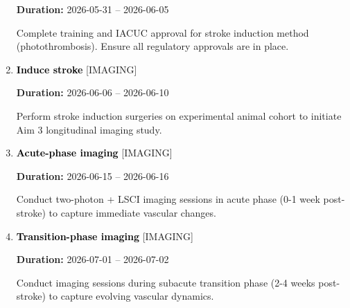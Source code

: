 \documentclass[landscape,a4paper]{article}
\begin{document}
\begin{enumerate}[leftmargin=1.5cm, itemsep=1em]
          \vspace{0.2em}
          \textcolor{black!70}{\textbf{Duration:} 2026-05-31 -- 2026-06-05}

          \vspace{0.4em}
          \begin{minipage}[t]{0.9\textwidth}
          \textcolor{black!85}{Complete training and IACUC approval for stroke induction method (photothrombosis). Ensure all regulatory approvals are in place.}
          \end{minipage}


    \item \textcolor{black}{\textbf{\large Induce stroke}}
          \hfill \textcolor{black!60}{\small [IMAGING]}
          
          \vspace{0.2em}
          \textcolor{black!70}{\textbf{Duration:} 2026-06-06 -- 2026-06-10}

          \vspace{0.4em}
          \begin{minipage}[t]{0.9\textwidth}
          \textcolor{black!85}{Perform stroke induction surgeries on experimental animal cohort to initiate Aim 3 longitudinal imaging study.}
          \end{minipage}


    \item \textcolor{black}{\textbf{\large Acute-phase imaging}}
          \hfill \textcolor{black!60}{\small [IMAGING]}
          
          \vspace{0.2em}
          \textcolor{black!70}{\textbf{Duration:} 2026-06-15 -- 2026-06-16}

          \vspace{0.4em}
          \begin{minipage}[t]{0.9\textwidth}
          \textcolor{black!85}{Conduct two-photon + LSCI imaging sessions in acute phase (0-1 week post-stroke) to capture immediate vascular changes.}
          \end{minipage}


    \item \textcolor{black}{\textbf{\large Transition-phase imaging}}
          \hfill \textcolor{black!60}{\small [IMAGING]}
          
          \vspace{0.2em}
          \textcolor{black!70}{\textbf{Duration:} 2026-07-01 -- 2026-07-02}

          \vspace{0.4em}
          \begin{minipage}[t]{0.9\textwidth}
          \textcolor{black!85}{Conduct imaging sessions during subacute transition phase (2-4 weeks post-stroke) to capture evolving vascular dynamics.}
          \end{minipage}



\end{enumerate}
\end{document}
